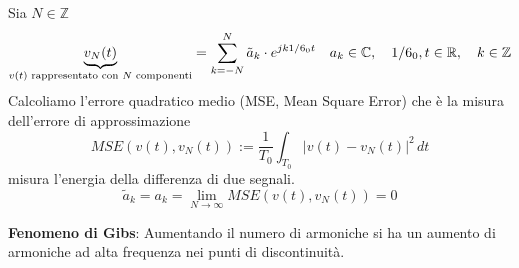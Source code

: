 \documentclass[a4paper]{article}
\begin{document}
\vspace{1em}
\noindent
Sia \( N \in \mathbb{Z} \) 
\[
  \underbrace{v_N(t)}_{\text{\( v(t) \) rappresentato con \( N \) componenti}} =
  \sum_{k=-N}^{N} \tilde{a}_k \cdot e^{j k \omega_0 t} \quad a_k \in \mathbb{C}, \quad \omega_0,t \in \mathbb{R},
  \quad k \in \mathbb{Z}
\] 
Calcoliamo l'errore quadratico medio (MSE, Mean Square Error) che è la misura
dell'errore di approssimazione
\[
  MSE\left(v(t),v_N(t)\right) := \frac{1}{T_0} \int_{T_0} |v(t) - v_N(t)|^2 \, dt
\] 
misura l'energia della differenza di due segnali.
\[
  \tilde{a}_k = a_k = \lim_{N \to \infty} MSE\left(v(t),v_N(t)\right) = 0
\] 
\begin{define}
  \textbf{Fenomeno di Gibs}: Aumentando il numero di armoniche si ha un aumento
  di armoniche ad alta frequenza nei punti di discontinuità.
  \begin{figure}[H]
    \centering
\end{figure}
\end{define}
\end{document}

